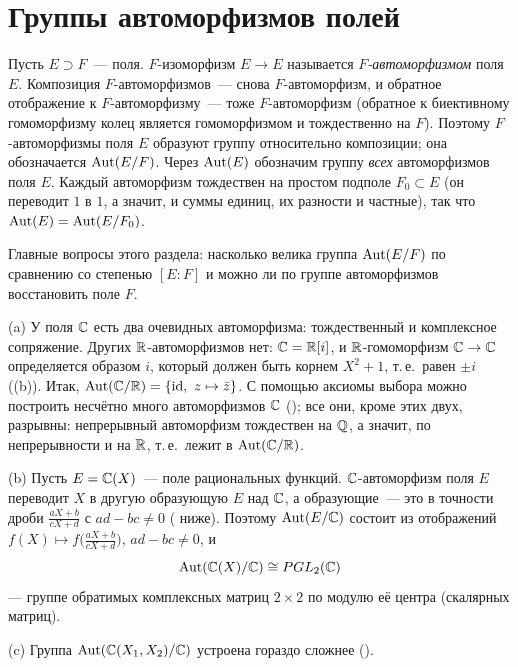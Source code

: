 \makeatletter
{}
\makeatother
\section{Группы автоморфизмов полей}

Пусть $E\supset F$~--- поля. $F$-изоморфизм $E\to E$ называется \emph{$F$-автоморфизмом} поля $E$. Композиция
$F$-автоморфизмов~--- снова $F$-автоморфизм, и обратное отображение к $F$-автоморфизму~--- тоже $F$-автоморфизм (обратное
к биективному гомоморфизму колец является гомоморфизмом и тождественно на $F$). Поэтому $F$-автоморфизмы поля $E$
образуют группу относительно композиции; она обозначается $\operatorname{Aut}(E/F)$. Через $\operatorname{Aut}(E)$ обозначим группу \emph{всех}
автоморфизмов поля $E$. Каждый автоморфизм тождествен на простом подполе $F_0\subset E$ (он переводит $1$ в $1$, а значит,
и суммы единиц, их разности и частные), так что $\operatorname{Aut}(E)=\operatorname{Aut}(E/F_0)$.

Главные вопросы этого раздела: насколько велика группа $\operatorname{Aut}(E/F)$ по сравнению со степенью $[E:F]$ и можно ли по группе
автоморфизмов восстановить поле $F$.

\begin{example}[3.1]
(a) У поля $\mathbb C$ есть два очевидных автоморфизма: тождественный и комплексное сопряжение. Других
$\mathbb R$-автоморфизмов нет: $\mathbb C=\mathbb R[i]$, и $\mathbb R$-гомоморфизм $\mathbb C\to\mathbb C$ определяется образом $i$, который должен быть
корнем $X^2+1$, т.\,е.\ равен $\pm i$ ((b)). Итак, $\Aut(\CC/\R)=\{\id,\ z\mapsto\bar z\}$. С помощью аксиомы
выбора можно построить несчётно много автоморфизмов $\mathbb C$ (); все они, кроме этих двух, разрывны:
непрерывный автоморфизм тождествен на $\mathbb Q$, а значит, по непрерывности и на $\mathbb R$, т.\,е.\ лежит в $\operatorname{Aut}(\mathbb C/\mathbb R)$.

(b) Пусть $E=\mathbb C(X)$~--- поле рациональных функций. $\mathbb C$-автоморфизм поля $E$ переводит $X$ в другую образующую $E$
над $\mathbb C$, а образующие~--- это в точности дроби $\frac{aX+b}{cX+d}$ с $ad-bc\ne0$ ( ниже). Поэтому $\operatorname{Aut}(E/\mathbb C)$
состоит из отображений $f(X)\mapsto f\bigl(\frac{aX+b}{cX+d}\bigr)$, $ad-bc\ne0$, и
\[
\operatorname{Aut}(\mathbb C(X)/\mathbb C)\cong PGL_2(\mathbb C)
\]
--- группе обратимых комплексных матриц $2\times2$ по модулю её центра (скалярных матриц).

(c) Группа $\operatorname{Aut}(\mathbb C(X_1,X_2)/\mathbb C)$ устроена гораздо сложнее ().
\end{example}


